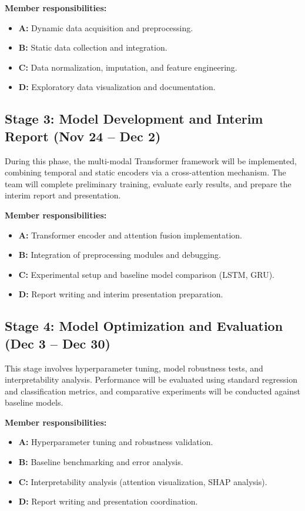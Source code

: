 \textbf{Member responsibilities:}
\begin{itemize}
    \item \textbf{A:} Dynamic data acquisition and preprocessing.
    \item \textbf{B:} Static data collection and integration.
    \item \textbf{C:} Data normalization, imputation, and feature engineering.
    \item \textbf{D:} Exploratory data visualization and documentation.
\end{itemize}

\subsection{Stage 3: Model Development and Interim Report (Nov 24 -- Dec 2)}
During this phase, the multi-modal Transformer framework will be implemented, combining temporal and static encoders via a cross-attention mechanism. The team will complete preliminary training, evaluate early results, and prepare the interim report and presentation.

\textbf{Member responsibilities:}
\begin{itemize}
    \item \textbf{A:} Transformer encoder and attention fusion implementation.
    \item \textbf{B:} Integration of preprocessing modules and debugging.
    \item \textbf{C:} Experimental setup and baseline model comparison (LSTM, GRU).
    \item \textbf{D:} Report writing and interim presentation preparation.
\end{itemize}

\subsection{Stage 4: Model Optimization and Evaluation (Dec 3 -- Dec 30)}
This stage involves hyperparameter tuning, model robustness tests, and interpretability analysis. Performance will be evaluated using standard regression and classification metrics, and comparative experiments will be conducted against baseline models.

\textbf{Member responsibilities:}
\begin{itemize}
    \item \textbf{A:} Hyperparameter tuning and robustness validation.
    \item \textbf{B:} Baseline benchmarking and error analysis.
    \item \textbf{C:} Interpretability analysis (attention visualization, SHAP analysis).
    \item \textbf{D:} Report writing and presentation coordination.
\end{itemize}


